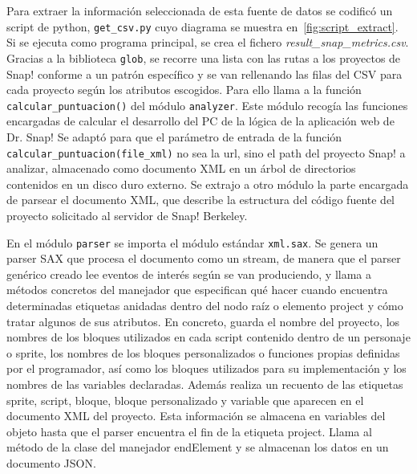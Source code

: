 \documentclass[a4paper, 12pt]{book}
\begin{document}
Para extraer la información seleccionada de esta fuente de datos se codificó un script de python, \texttt{get\_csv.py} cuyo diagrama se muestra en~\ref{fig:script_extract}. Si se ejecuta como programa principal, se crea el fichero \emph{result\_snap\_metrics.csv}. Gracias a la biblioteca \texttt{glob}, se recorre una lista con las rutas a los proyectos de Snap! conforme a un patrón específico y se van rellenando las filas del CSV para cada proyecto según los atributos escogidos. Para ello llama a la función \texttt{calcular\_puntuacion()} del módulo \texttt{analyzer}. Este módulo recogía las funciones encargadas de calcular el desarrollo del PC de la lógica de la aplicación web de Dr. Snap! Se adaptó para que el parámetro de entrada de la función \texttt{calcular\_puntuacion(file\_xml)} no sea la url, sino el path del proyecto Snap! a analizar, almacenado como documento XML en un árbol de directorios contenidos en un disco duro externo. Se extrajo a otro módulo la parte encargada de parsear el documento XML, que describe la estructura del código fuente del proyecto solicitado al servidor de Snap! Berkeley. 

En el módulo \texttt{parser} se importa el módulo estándar \texttt{xml.sax}. Se genera un parser SAX que procesa el documento como un stream, de manera que el parser genérico creado lee eventos de interés según se van produciendo, y llama a métodos concretos del manejador que especifican qué hacer cuando encuentra determinadas etiquetas anidadas dentro del nodo raíz o elemento project y cómo tratar algunos de sus atributos. En concreto, guarda el nombre del proyecto, los nombres de los bloques utilizados en cada script contenido dentro de un personaje o sprite, los nombres de los bloques personalizados o funciones propias definidas por el programador, así como los bloques utilizados para su implementación y los nombres de las variables declaradas. Además realiza un recuento de las etiquetas sprite, script, bloque, bloque personalizado y variable que aparecen en el documento XML del proyecto. Esta información se almacena en variables del objeto hasta que el parser encuentra el fin de la etiqueta project. Llama al método de la clase del manejador endElement y se almacenan los datos en un documento JSON.
\end{document}
